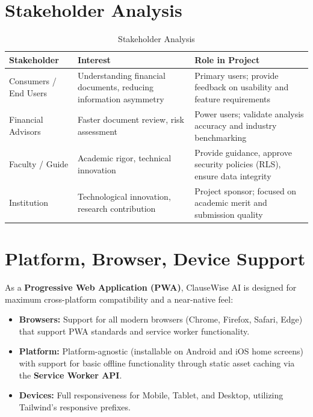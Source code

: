 \documentclass[12pt,a4paper,oneside]{report}
\begin{document}
\section{Stakeholder Analysis}

\begin{table}[htbp]
\centering
\caption{Stakeholder Analysis}
\label{tab:stakeholder}
\small
\begin{tabular}{|p{3cm}|p{4.5cm}|p{4.5cm}|}
\hline
\textbf{Stakeholder} & \textbf{Interest} & \textbf{Role in Project} \\
\hline
Consumers / End Users & Understanding financial documents, reducing information asymmetry & Primary users; provide feedback on usability and feature requirements \\ \hline
Financial Advisors & Faster document review, risk assessment & Power users; validate analysis accuracy and industry benchmarking \\ \hline
Faculty / Guide & Academic rigor, technical innovation & Provide guidance, approve security policies (RLS), ensure data integrity \\ \hline
Institution & Technological innovation, research contribution & Project sponsor; focused on academic merit and submission quality \\ \hline
\end{tabular}
\end{table}

\section{Platform, Browser, Device Support}

As a \textbf{Progressive Web Application (PWA)}, ClauseWise AI is designed for maximum cross-platform compatibility and a near-native feel:

\begin{itemize}[leftmargin=2cm]
  \item \textbf{Browsers:} Support for all modern browsers (Chrome, Firefox, Safari, Edge) that support PWA standards and service worker functionality.
  \item \textbf{Platform:} Platform-agnostic (installable on Android and iOS home screens) with support for basic offline functionality through static asset caching via the \textbf{Service Worker API}.
  \item \textbf{Devices:} Full responsiveness for Mobile, Tablet, and Desktop, utilizing Tailwind's responsive prefixes.
\end{itemize}
\end{document}
